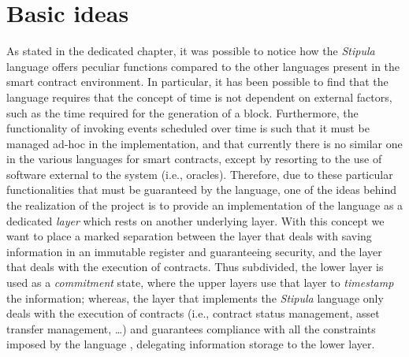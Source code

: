 \section{Basic ideas}
\label{basic-ideas}
As stated in the dedicated chapter, it was possible to notice how the \textit{Stipula} language offers 
peculiar functions compared to the other languages present in the smart contract environment. In particular, 
it has been possible to find that the language requires that the concept of time is not dependent on 
external factors, such as the time required for the generation of a block. Furthermore, the functionality 
of invoking events scheduled over time is such that it must be managed ad-hoc in the implementation, and 
that currently there is no similar one in the various languages for smart contracts, except by resorting to 
the use of software external to the system (i.e., oracles). Therefore, due to these particular 
functionalities that must be guaranteed by the language, one of the ideas behind the realization of the 
project is to provide an implementation of the language as a dedicated \textit{layer} which rests on 
another underlying layer. With this concept we want to place a marked separation between the layer that 
deals with saving information in an immutable register and guaranteeing security, and the layer that deals 
with the execution of contracts. Thus subdivided, the lower layer is used as a \textit{commitment} state, 
where the upper layers use that layer to \textit{timestamp} the information; whereas, the layer that 
implements the \textit{Stipula} language only deals with the execution of contracts (i.e., contract 
status management, asset transfer management, \dots) and guarantees compliance with all the constraints 
imposed by the language , delegating information storage to the lower layer.

